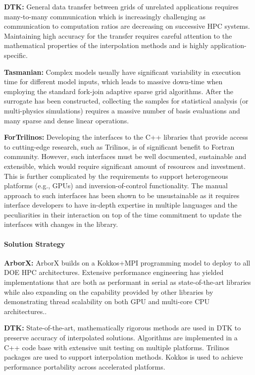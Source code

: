 {\bf DTK:} General data transfer between grids of unrelated applications
requires many-to-many communication which is increasingly challenging as
communication to computation ratios are decreasing on successive HPC systems.
Maintaining high accuracy for the transfer requires careful attention to the
mathematical properties of the interpolation methods and is highly
application-specific.

{\bf Tasmanian:} Complex models usually have significant variability in
execution time for different model inputs, which leads to massive down-time
when employing the standard fork-join adaptive sparse grid algorithms.  After
the surrogate has been constructed, collecting the samples for statistical
analysis (or multi-physics simulations) requires a massive number of basis
evaluations and many sparse and dense linear operations.

{\bf ForTrilinos:} Developing the interfaces to the C++ libraries that provide
access to cutting-edge research, such as Trilinos,  is of significant benefit
to Fortran community. However, such interfaces must be well documented,
sustainable and extensible, which would require significant amount of resources
and investment. This is further complicated by the requirements to support
heterogeneous platforms (e.g., GPUs) and inversion-of-control functionality.
The manual approach to such interfaces has been shown to be unsustainable as it
requires interface developers to have in-depth expertise in  multiple languages
and the peculiarities in their interaction on top of the time commitment to
update the interfaces with changes in the library.

\paragraph{Solution Strategy}

\nobreak


\indent

{\bf ArborX:} ArborX builds on a Kokkos+MPI programming model to deploy to all
DOE HPC architectures. Extensive performance engineering has yielded
implementations that are both as performant in serial as state-of-the-art
libraries while also expanding on the capability provided by other libraries
by demonstrating thread scalability on both GPU and multi-core CPU
architectures..

{\bf DTK:} State-of-the-art, mathematically rigorous methods are used in DTK
to preserve accuracy of interpolated solutions.  Algorithms are implemented in
a C++ code base with extensive unit testing on multiple platforms.  Trilinos
packages are used to support interpolation methods.  Kokkos is used to achieve
performance portability across accelerated platforms.

